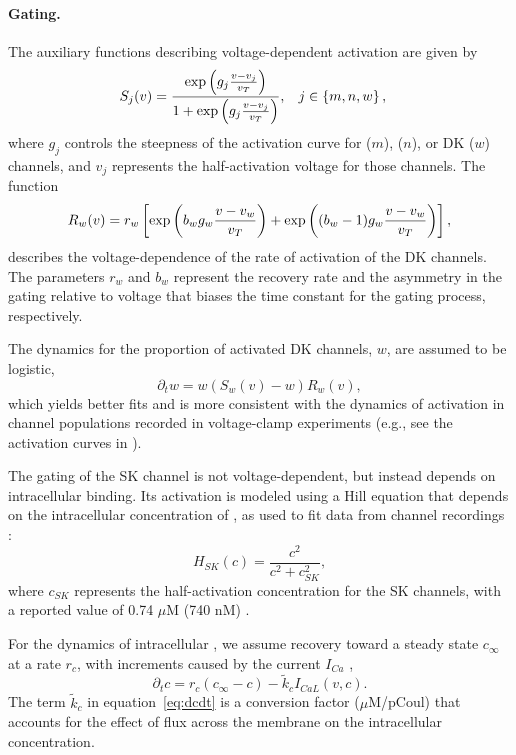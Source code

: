 \documentclass[12pt]{article}
\begin{document}
\paragraph{Gating.} 
The auxiliary functions describing voltage-dependent activation are given by
\begin{align}
S_j(v) &= \frac{\textrm{exp}\left(g_j \frac{v-v_j}{v_T} \right)}{1 + \textrm{exp}\left(g_j \frac{v-v_j}{v_T} \right)}, \hspace{0.3cm} j \in \left\{m,n,w\right\}, 
\label{eq:gating}
\end{align}
where $g_j$ controls the steepness of the activation curve for {\Na} ($m$), {\Ca} ($n$), or DK ($w$) channels, and $v_j$ represents the half-activation voltage for those channels. 
The function
\begin{equation}
    R_w(v) = r_w \left[ \exp \left(b_w g_w\frac{v-v_w}{v_T}\right) + \exp \left((b_w-1)g_w\frac{v-v_w}{v_T}\right)\right],
\label{eq:actRate}
\end{equation}  
describes the voltage-dependence of the rate of activation of the DK channels. The parameters  $r_w$ and $b_w$ represent the recovery rate  and  the asymmetry in the gating relative to voltage that biases the time constant for the gating process, respectively. 

The dynamics for the proportion of activated DK channels, $w$,  are assumed to be logistic,
\begin{equation}
\partial_t{w} = w (S_w(v)-w)  R_w(v), \label{eq:dwdt}
\end{equation}
which yields better fits and is more consistent with the dynamics of activation in channel populations recorded in voltage-clamp experiments (e.g., see the activation curves in  \cite{Covarrubiasetal1991,hodgkin1952quantitative,TsunodaSalkoff1995b}).

The gating of the SK channel is not voltage-dependent, but instead depends on intracellular {\Ca} binding. Its activation is modeled using a Hill equation that depends on the intracellular concentration of {\Ca}, as used to fit data from channel recordings \citep{hirschberg1998gating}:
\begin{equation}
H_{SK}(c) = \frac{c^2}{c^2 + c_{SK}^2},
\end{equation}
where $c_{SK}$ represents the half-activation {\Ca} concentration for the SK channels, with a reported value of 0.74 $\mu$M (740 nM) \citep{hirschberg1998gating,stocker20042+}.

For the dynamics of intracellular {\Ca}, we assume recovery toward a steady state $c_{\infty}$ at a rate $r_c$, with increments caused by the {\Ca} current $I_{Ca}$ \citep{avron1991minimal},
\begin{equation}
\partial_t{c} = r_{c}({c_{\infty} - c}) - \tilde{k}_{c} I_{CaL}(v,c).
\label{eq:dcdt}
\end{equation}
The term $\tilde{k}_c$ in equation~\eqref{eq:dcdt} is a conversion factor ($\mu$M/pCoul) that accounts for the effect of {\Ca} flux across the membrane on the intracellular {\Ca} concentration. 
\end{document}

